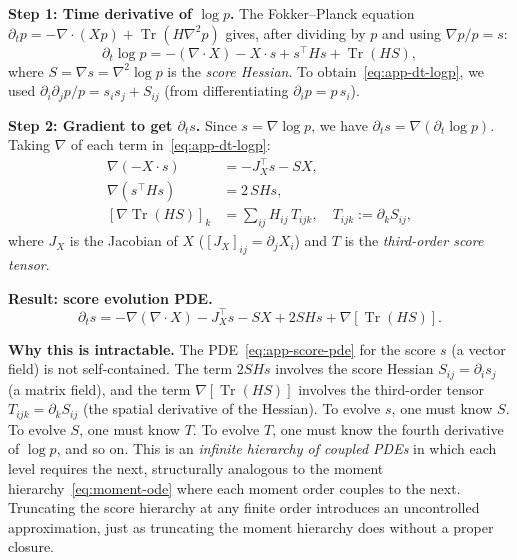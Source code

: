 \documentclass{article}
\newcommand{\Tr}{\operatorname{Tr}}
\theoremstyle{definition}
\begin{document}
\textbf{Step 1: Time derivative of $\log p$.}
The Fokker--Planck equation $\partial_t p = -\nabla \cdot (Xp) + \Tr(H\nabla^2 p)$
gives, after dividing by $p$ and using $\nabla p / p = s$:
\begin{equation}\label{eq:app-dt-logp}
    \partial_t \log p = -(\nabla \cdot X) - X \cdot s + s^\top H s + \Tr(HS),
\end{equation}
where $S = \nabla s = \nabla^2 \log p$ is the \emph{score Hessian}.
To obtain~\eqref{eq:app-dt-logp}, we used
$\partial_i\partial_j p / p = s_i s_j + S_{ij}$
(from differentiating $\partial_i p = p\, s_i$).

\textbf{Step 2: Gradient to get $\partial_t s$.}
Since $s = \nabla \log p$, we have $\partial_t s = \nabla(\partial_t \log p)$.
Taking $\nabla$ of each term in~\eqref{eq:app-dt-logp}:
\begin{align}
    \nabla(-X \cdot s) &= -J_X^\top s - S X, \label{eq:app-term2} \\
    \nabla(s^\top H s) &= 2\, S H s, \label{eq:app-term3} \\
    [\nabla\Tr(HS)]_k &= \textstyle\sum_{ij} H_{ij}\, T_{ijk},
    \quad T_{ijk} := \partial_k S_{ij}, \label{eq:app-term4}
\end{align}
where $J_X$ is the Jacobian of $X$ ($[J_X]_{ij} = \partial_j X_i$)
and $T$ is the \emph{third-order score tensor}.

\textbf{Result: score evolution PDE.}
\begin{equation}\label{eq:app-score-pde}
    \boxed{
    \partial_t s = -\nabla(\nabla \cdot X) - J_X^\top s - SX + 2SHs
    + \nabla[\Tr(HS)].
    }
\end{equation}

\textbf{Why this is intractable.}
The PDE~\eqref{eq:app-score-pde} for the score $s$ (a vector field)
is not self-contained.
The term $2SHs$ involves the score Hessian $S_{ij} = \partial_i s_j$
(a matrix field), and the term $\nabla[\Tr(HS)]$ involves the third-order
tensor $T_{ijk} = \partial_k S_{ij}$ (the spatial derivative of the Hessian).
To evolve $s$, one must know $S$. To evolve $S$, one must know $T$.
To evolve $T$, one must know the fourth derivative of $\log p$,
and so on.
This is an \emph{infinite hierarchy of coupled PDEs} in which each level
requires the next, structurally analogous to the moment
hierarchy~\eqref{eq:moment-ode} where each moment order
couples to the next.
Truncating the score hierarchy at any finite order introduces
an uncontrolled approximation, just as truncating the moment
hierarchy does without a proper closure.
\end{document}
